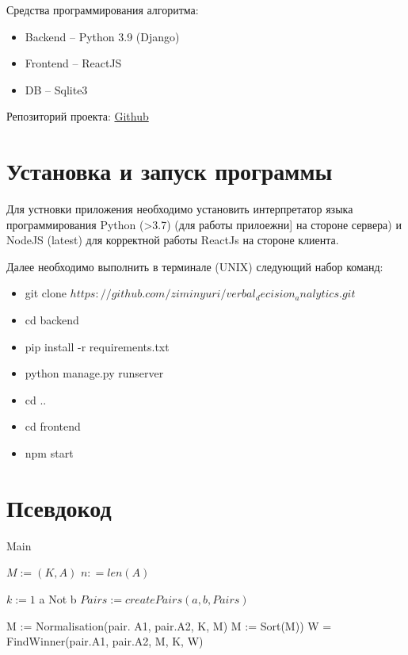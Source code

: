 \documentclass[a4paper, 14pt]{report}
\begin{document}
Средства программирования алгоритма: 
\begin{itemize}
\item Backend – Python 3.9 (Django)
\item Frontend – ReactJS
\item DB – Sqlite3
\end{itemize}

Репозиторий проекта: \href{https://github.com/ziminyuri/verbal_decision_analytics}{Github}

\section{Установка и запуск программы}
Для устновки приложения необходимо установить интерпретатор языка программирования Python (>3.7) (для работы прилоежни] на стороне сервера) и NodeJS (latest) для корректной работы ReactJs на стороне клиента.

Далее необходимо  выполнить в терминале (UNIX) следующий набор команд:
\begin{itemize}
	\item git clone ${https://github.com/ziminyuri/verbal_decision_analytics.git}$
	
	\item cd backend
	
	\item pip install -r requirements.txt
	
	\item python manage.py runserver
	
	\item cd ..
	
	\item cd frontend
	
	\item npm start
\end{itemize}

\section{Псевдокод}

	\begin{algorithm}
	\caption{Main}\label{alg:Main}
	\begin{algorithmic}[1]
		\State $M := (K, A)$
		\State $n : = len(A)$
		
		\State $k := 1$
				\If a Not b
					\State $Pairs := createPairs(a, b, Pairs) $
				\EndIf
			\EndFor
		\EndFor
		
		\State M := Normalisation(pair. A1, pair.A2, K, M)
		\State M := Sort(M))
		\State W = FindWinner(pair.A1, pair.A2, M, K, W)
		\EndFor
	\end{algorithmic}
\end{algorithm}
\end{document}
